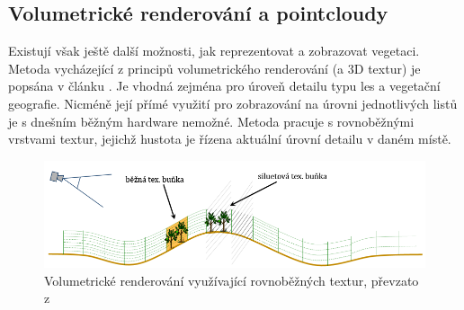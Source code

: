 \subsection{Volumetrické renderování a pointcloudy}
Existují však ještě další možnosti, jak reprezentovat a zobrazovat vegetaci. Metoda vycházející z principů volumetrického renderování (a 3D textur) je popsána v článku \cite{DN04}. Je vhodná zejména pro úroveň detailu typu les a vegetační geografie. Nicméně její přímé využití pro zobrazování na úrovni jednotlivých listů je s dnešním běžným hardware nemožné. Metoda pracuje s rovnoběžnými vrstvami textur, jejichž hustota je řízena aktuální úrovní detailu v daném místě.
\begin{figure}[here]
\begin{center}
\includegraphics[width=1.0\textwidth]{./figures/a1_slicing.png}
\end{center}
\caption[Volumetrické renderování využívající rovnoběžných textur]%
{Volumetrické renderování využívající rovnoběžných textur, převzato z \cite{DN04}
}
\label{fig:VOLUME_texcells}
\end{figure}

